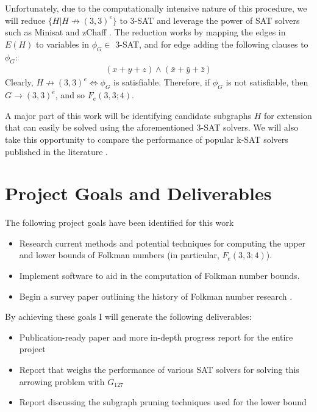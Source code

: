 \documentclass[paper=a4, fontsize=11pt]{scrartcl} %
\begin{document}
Unfortunately, due to the computationally intensive nature of this procedure, we will 
reduce $\{H | H \not \to (3,3)^e\}$ to 3-SAT and leverage
the power of SAT solvers such as Minisat \cite{minisat} and zChaff \cite{zchaff}. The reduction works by
mapping the edges in $E(H)$ to variables in $\phi_G \in$ 3-SAT, and for edge adding the following
clauses to $\phi_G$:
\begin{align*}
(x + y + z) \wedge (\bar{x} + \bar{y} + \bar{z})
\end{align*}
Clearly, $H \not \to (3,3)^e \Leftrightarrow \phi_G$ is satisfiable. Therefore, if $\phi_G$ is not satisfiable,
then $G \to (3,3)^e$, and so $F_e(3,3;4)$.

A major part of this work will be identifying candidate subgraphs $H$ for extension that 
can easily be solved using the aforementioned 3-SAT solvers. We will also take this opportunity
to compare the performance of popular k-SAT solvers published in the literature \cite{zchaff} \cite{minisat}.

\section{Project Goals and Deliverables}
The following project goals have been identified for this work
\begin{itemize}
	\item Research current methods and potential techniques for computing the upper and lower bounds of Folkman 
	numbers (in particular, $F_e(3,3;4)$).
	\item Implement software to aid in the computation of Folkman number bounds.
	\item Begin a survey paper outlining the history of Folkman number research \cite{sprSurvey}.
\end{itemize}

By achieving these goals I will generate the following deliverables:
\begin{itemize}
	\item Publication-ready paper and more in-depth progress report for the entire project
	\item Report that weighs the performance of various SAT solvers for solving this arrowing problem with $G_{127}$
	\item Report discussing the subgraph pruning techniques used for the lower bound
\end{itemize}

\end{document}
